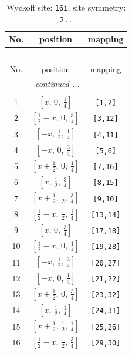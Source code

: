 \documentclass[fleqn,8pt]{jsarticle}
\begin{document}
\renewcommand{\arraystretch}{1.2}
\begin{longtable}{ccc}
\caption{Wyckoff site: {\tt 16i}, site symmetry: {\tt 2..}}
 \\
 \hline \hline
No. & position & mapping \\ \hline \endfirsthead

\multicolumn{2}{l}{\tablename\ \thetable{}} \\
 \hline \hline
No. & position & mapping \\ \hline \endhead

 \hline \hline
\multicolumn{2}{r}{\footnotesize\it continued ...} \\ \endfoot

 \hline \hline
\multicolumn{2}{r}{} \\ \endlastfoot

1 & $\left[ x,\, 0,\, \frac{1}{4} \right]$ & {\tt [1,2]} \\ \hline
2 & $\left[ \frac{1}{2} - x,\, 0,\, \frac{3}{4} \right]$ & {\tt [3,12]} \\ \hline
3 & $\left[ - x,\, \frac{1}{2},\, \frac{1}{4} \right]$ & {\tt [4,11]} \\ \hline
4 & $\left[ - x,\, 0,\, \frac{3}{4} \right]$ & {\tt [5,6]} \\ \hline
5 & $\left[ x + \frac{1}{2},\, 0,\, \frac{1}{4} \right]$ & {\tt [7,16]} \\ \hline
6 & $\left[ x,\, \frac{1}{2},\, \frac{3}{4} \right]$ & {\tt [8,15]} \\ \hline
7 & $\left[ x + \frac{1}{2},\, \frac{1}{2},\, \frac{3}{4} \right]$ & {\tt [9,10]} \\ \hline
8 & $\left[ \frac{1}{2} - x,\, \frac{1}{2},\, \frac{1}{4} \right]$ & {\tt [13,14]} \\ \hline
9 & $\left[ x,\, 0,\, \frac{3}{4} \right]$ & {\tt [17,18]} \\ \hline
10 & $\left[ \frac{1}{2} - x,\, 0,\, \frac{1}{4} \right]$ & {\tt [19,28]} \\ \hline
11 & $\left[ - x,\, \frac{1}{2},\, \frac{3}{4} \right]$ & {\tt [20,27]} \\ \hline
12 & $\left[ - x,\, 0,\, \frac{1}{4} \right]$ & {\tt [21,22]} \\ \hline
13 & $\left[ x + \frac{1}{2},\, 0,\, \frac{3}{4} \right]$ & {\tt [23,32]} \\ \hline
14 & $\left[ x,\, \frac{1}{2},\, \frac{1}{4} \right]$ & {\tt [24,31]} \\ \hline
15 & $\left[ x + \frac{1}{2},\, \frac{1}{2},\, \frac{1}{4} \right]$ & {\tt [25,26]} \\ \hline
16 & $\left[ \frac{1}{2} - x,\, \frac{1}{2},\, \frac{3}{4} \right]$ & {\tt [29,30]} \\
\end{longtable}
\end{document}
